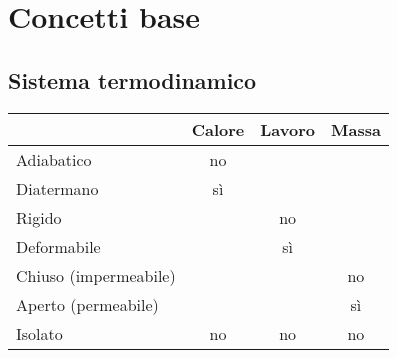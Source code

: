 \section{Concetti base}
\subsection{Sistema termodinamico}
\begin{tabular}{lccc}
    \toprule
    & Calore & Lavoro & Massa\\ \midrule
    Adiabatico & no & & \\
    Diatermano & sì & & \\
    Rigido & & no & \\
    Deformabile & & sì & \\
    Chiuso (impermeabile) & & & no \\
    Aperto (permeabile) & & & sì \\
    Isolato & no & no & no \\
    \bottomrule
\end{tabular}
